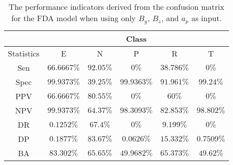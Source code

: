 \begin{table}[!ht]
	\centering
	\begin{tabular}{|c|c|c|c|c|c|}
		\hline
		 & \multicolumn{5}{c|}{Class} \\ \hline
		Statistics & E & N & P & R & T \\ \hline
		Sen & $66.6667\%$ & $92.05\%$ & $0\%$ & $38.786\%$ & $0\%$ \\ \hline
		Spec & $99.9373\%$ & $39.25\%$ & $99.9363\%$ & $91.961\%$ & $99.24\%$ \\ \hline
		PPV & $66.6667\%$ & $80.55\%$ & $0\%$ & $60\%$ & $0\%$ \\ \hline
		NPV & $99.9373\%$ & $64.37\%$ & $98.3093\%$ & $82.853\%$ & $98.802\%$ \\ \hline
		DR & $0.1252\%$ & $67.4\%$ & $0\%$ & $9.199\%$ & $0\%$ \\ \hline
		DP & $0.1877\%$ & $83.67\%$ & $0.0626\%$ & $15.332\%$ & $0.7509\%$ \\ \hline
		BA & $83.302\%$ & $65.65\%$ & $49.9682\%$ & $65.373\%$ & $49.62\%$ \\ \hline
	\end{tabular}
	\caption{The performance indicators derived from the confusion matrix for the FDA model when using only $B_{y}$, $B_{z}$, and $a_{p}$ as input.}
	\label{tab:cs:reverse:yzap:fda}
\end{table}
